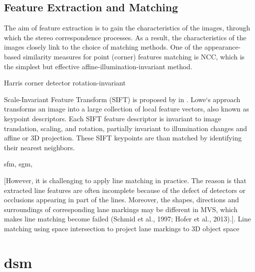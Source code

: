 \subsection{Feature Extraction and Matching}
The aim of feature extraction is to gain the characteristics of the images, through which the stereo correspondence processes. As a result, the characteristics of the images closely link to the choice of matching methods. %
One of the appearance-based similarity measures for point (corner) features matching is NCC, which is the simplest but effective affine-illumination-invariant method. 

Harris corner detector rotation-invariant

Scale-Invariant Feature Transform (SIFT) is proposed by \citeauthor{LoweSep1999} in \citeyear{LoweSep1999} \cite{LoweSep1999}. Lowe‘s approach transforms an image into a large collection of local feature vectors, also known as keypoint descriptors. Each SIFT feature descriptor is invariant to image translation, scaling, and rotation, partially invariant to illumination changes and affine or 3D projection. These SIFT keypoints are than matched by identifying their nearest neighbors.


sfm, sgm, 


[However, it is challenging to apply line matching in practice. The reason is that extracted line features are often incomplete because of the defect of detectors or occlusions appearing in part of the lines. Moreover, the shapes, directions and surroundings of corresponding lane markings may be different in MVS, which makes line matching become failed (Schmid et al., 1997; Hofer et al., 2013).]. Line matching%
using space intersection to project lane markings to 3D object space%





\section{\gls{dsm}}


